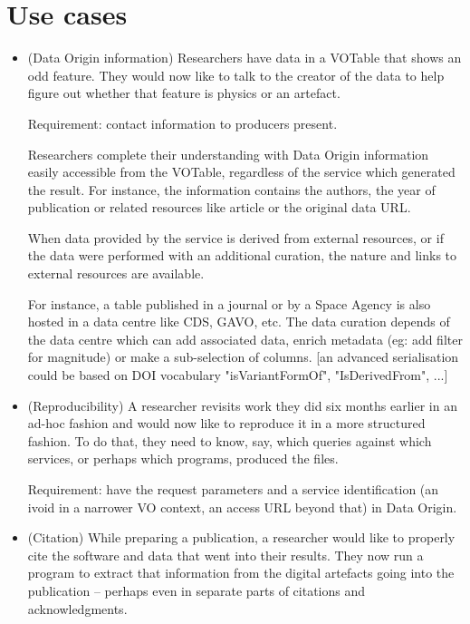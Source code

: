 \documentclass[11pt,a4paper]{ivoa}
\begin{document}
\section{Use cases}

\begin{itemize}
	\item (Data Origin information) Researchers have data in a VOTable that shows an odd feature. They would now like to talk to the creator of the data to help figure out whether that feature is physics or an artefact.
	
	Requirement: contact information to producers present.
	
	Researchers complete their understanding with Data Origin information easily accessible from the VOTable, regardless of the service which generated the result. For instance, the information contains the authors, the year of publication or related resources like article or the original data URL.
		
	When data provided by the service is derived from external resources, or if the data were performed with an additional curation, the nature and links to external resources are available.
	
	For instance, a table published in a journal or by a Space Agency is also hosted in a data centre like CDS, GAVO, etc. The data curation depends of the data centre which can add associated data, enrich metadata (eg: add filter for magnitude) or make a sub-selection of columns. [an advanced serialisation could be based on DOI vocabulary "isVariantFormOf", "IsDerivedFrom", ...]
	
	\item (Reproducibility) A researcher revisits work they did six months earlier in an ad-hoc fashion and would now like to reproduce it in a more structured fashion. To do that, they need to know, say, which queries against which services, or perhaps which programs, produced the files.
	
	Requirement: have the request parameters and a service identification
	(an ivoid in a narrower VO context, an access URL beyond that)
	in Data Origin.
	
	\item (Citation) While preparing a publication, a researcher would like to properly cite the software and data that went into their results. They now run a program to extract that information from the digital artefacts going into the publication -- perhaps even in separate parts of citations and acknowledgments.
	

\end{itemize}
\end{document}
